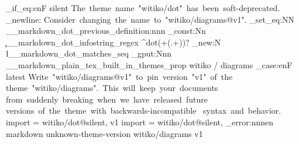   {
    \str_if_eq:enF
      { \markdownThemeVersion }
      { silent }
      {
        \markdownWarning
          {
            The~theme~name~"witiko/dot"~has~been~soft-deprecated.
            \iow_newline:
            Consider~changing~the~name~to~"witiko/diagrams@v1".
          }
      }
    \cs_set_eq:NN
      \__markdown_dot_previous_definition:nnn
      \markdownRendererInputFencedCodePrototype
    \regex_const:Nn
      \c__markdown_dot_infostring_regex
      { ^dot(\s+(.+))? }
    \seq_new:N
      \l__markdown_dot_matches_seq
  }
\prop_gput:Nnn
  \g__markdown_plain_tex_built_in_themes_prop
  { witiko / diagrams }
  {
    \str_case:enF
      { \markdownThemeVersion }
      {
        { latest }
          {
            \markdownWarning
              {
                Write~"witiko/diagrams@v1"~to~pin~version~"v1"~of~the~
                theme~"witiko/diagrams".~This~will~keep~your~documents~
                from~suddenly~breaking~when~we~have~released~future~
                versions~of~the~theme~with~backwards-incompatible~
                syntax~and~behavior.
              }
            \markdownSetup
              {
                import = witiko/dot@silent,
              }
          }
        { v1 }
          {
            \markdownSetup
              {
                import = witiko/dot@silent,
              }
          }
      }
      {
        \msg_error:nnnen
          { markdown }
          { unknown-theme-version }
          { witiko/diagrams }
          { \markdownThemeVersion }
          { v1 }
      }
  }
